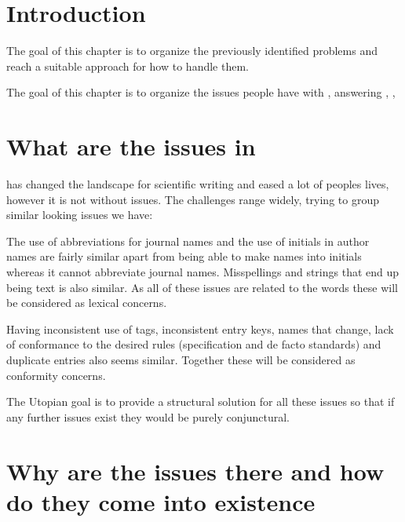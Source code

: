 \section{Introduction}
The goal of this chapter is to organize the previously identified
problems and reach a suitable approach for how to handle them.

The goal of this chapter is to organize the issues people have with
{\bibtex}, answering ,
, 

\section{What are the issues in {\bibtex}}
\label{sec:intro_what_issues}

{\bibtex} has changed the landscape for scientific writing and eased a
lot of peoples lives, however it is not without issues.  The
challenges range widely, trying to group similar looking issues we
have:

The use of abbreviations for journal names and the use of initials in
author names are fairly similar apart from {\bibtex} being able to make
names into initials whereas it cannot abbreviate journal names.
Misspellings and {\bibtex} strings that end up being text is also
similar.  As all of these issues are related to the words these will
be considered as lexical concerns.

Having inconsistent use of tags, inconsistent entry keys, names that
change, lack of conformance to the desired rules (specification and de
facto standards) and duplicate entries also seems similar.  Together
these will be considered as conformity concerns.

The Utopian goal is to provide a structural solution for all these
issues so that if any further issues exist they would be purely
conjunctural.

%
%


\section{Why are the {\bibtex} issues there and how do they come into
  existence}
\label{sec:intro_whyhow}

